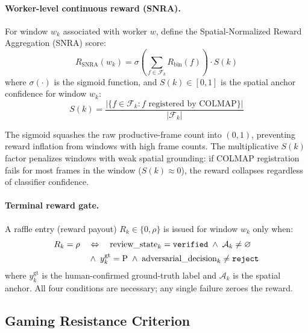 \documentclass[sigconf,nonacm]{acmart}
\begin{document}
\paragraph{Worker-level continuous reward (SNRA).}
For window $w_k$ associated with worker $w$, define the Spatial-Normalized
Reward Aggregation (SNRA) score:
\begin{equation}
  R_{\text{SNRA}}(w_k) = \sigma\!\left(\sum_{f \in \mathcal{F}_k}
    R_{\text{bin}}(f)\right) \cdot S(k)
\end{equation}
where $\sigma(\cdot)$ is the sigmoid function, and $S(k) \in [0,1]$ is the
spatial anchor confidence for window $w_k$:
\begin{equation}
  S(k) = \frac{|\{f \in \mathcal{F}_k : f \text{ registered by COLMAP}\}|}
              {|\mathcal{F}_k|}
\end{equation}

The sigmoid squashes the raw productive-frame count into $(0,1)$, preventing
reward inflation from windows with high frame counts. The multiplicative
$S(k)$ factor penalizes windows with weak spatial grounding: if COLMAP
registration fails for most frames in the window ($S(k) \approx 0$), the
reward collapses regardless of classifier confidence.

\paragraph{Terminal reward gate.}
A raffle entry (reward payout) $R_k \in \{0, \rho\}$ is issued for window
$w_k$ only when:
\begin{align}
  R_k = \rho \quad &\Leftrightarrow \quad \text{review\_state}_k = \texttt{verified}
                    \;\wedge\; \mathcal{A}_k \neq \varnothing \notag\\
                   &\wedge\; y_k^{\text{gt}} = \mathrm{P}
                    \;\wedge\; \text{adversarial\_decision}_k \neq \texttt{reject}
\end{align}
where $y_k^{\text{gt}}$ is the human-confirmed ground-truth label and
$\mathcal{A}_k$ is the spatial anchor. All four conditions are necessary;
any single failure zeroes the reward.

\subsection{Gaming Resistance Criterion}
\label{sec:gaming-resistance}
\end{document}
